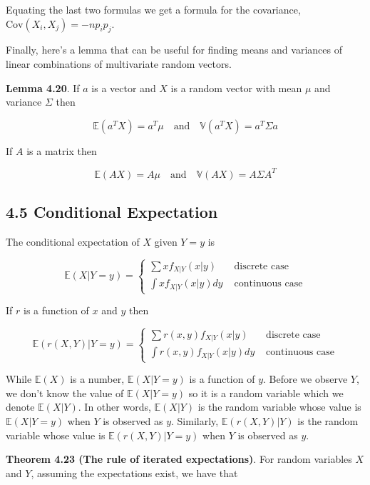 Equating the last two formulas we get a formula for the covariance,
\(\text{Cov}(X_i, X_j) = -np_ip_j\).

Finally, here's a lemma that can be useful for finding means and
variances of linear combinations of multivariate random vectors.

\textbf{Lemma 4.20}. If \(a\) is a vector and \(X\) is a random vector
with mean \(\mu\) and variance \(\Sigma\) then

\[ \mathbb{E}(a^T X) = a^T \mu
\quad \text{and} \quad
\mathbb{V}(a^T X) = a^T \Sigma a \]

If \(A\) is a matrix then

\[ \mathbb{E}(A X) = A \mu
\quad \text{and} \quad
\mathbb{V}(AX) = A \Sigma A^T \]

\subsection{4.5 Conditional
Expectation}\label{conditional-expectation}

The conditional expectation of \(X\) given \(Y = y\) is

\[ \mathbb{E}(X | Y = y) = \begin{cases}
\sum x f_{X | Y}(x | y) &\text{ discrete case} \\
\int x f_{X | Y}(x | y) dy &\text{ continuous case}
\end{cases}
\]

If \(r\) is a function of \(x\) and \(y\) then

\[ \mathbb{E}(r(X, Y) | Y = y) = \begin{cases}
\sum r(x, y) f_{X | Y}(x | y) &\text{ discrete case} \\
\int r(x, y) f_{X | Y}(x | y) dy &\text{ continuous case}
\end{cases}
\]

While \(\mathbb{E}(X)\) is a number, \(\mathbb{E}(X | Y = y)\) is a
function of \(y\). Before we observe \(Y\), we don't know the value of
\(\mathbb{E}(X | Y = y)\) so it is a random variable which we denote
\(\mathbb{E}(X | Y)\). In other words, \(\mathbb{E}(X | Y)\) is the
random variable whose value is \(\mathbb{E}(X | Y = y)\) when \(Y\) is
observed as \(y\). Similarly, \(\mathbb{E}(r(X, Y) | Y)\) is the random
variable whose value is \(\mathbb{E}(r(X, Y) | Y = y)\) when \(Y\) is
observed as \(y\).

\textbf{Theorem 4.23 (The rule of iterated expectations)}. For random
variables \(X\) and \(Y\), assuming the expectations exist, we have that

